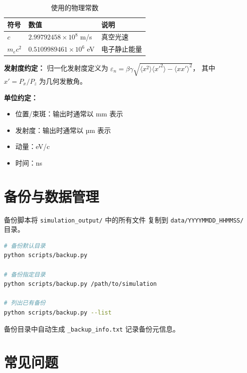 \documentclass[11pt,a4paper]{article}
\begin{document}
\begin{table}[h]
\centering
\caption{使用的物理常数}
\begin{tabular}{@{}lll@{}}
\toprule
\textbf{符号} & \textbf{数值} & \textbf{说明} \\
\midrule
$c$    & $2.99792458 \times 10^8$ m/s & 真空光速 \\
$m_e c^2$ & $0.5109989461 \times 10^6$ eV & 电子静止能量 \\
\bottomrule
\end{tabular}
\end{table}

\textbf{发射度约定：}
归一化发射度定义为
$\varepsilon_{n} = \beta\gamma \sqrt{\langle x^2\rangle\langle x'^2\rangle -
\langle xx'\rangle^2}$，
其中 $x' = P_x / P_z$ 为几何发散角。

\textbf{单位约定：}
\begin{itemize}
    \item 位置/束斑：输出时通常以 mm 表示
    \item 发射度：输出时通常以 µm 表示
    \item 动量：eV/c
    \item 时间：ns
\end{itemize}

\section{备份与数据管理}

备份脚本将 \texttt{simulation\_output/} 中的所有文件
复制到 \texttt{data/YYYYMMDD\_HHMMSS/} 目录。

\begin{lstlisting}[language=bash]
# 备份默认目录
python scripts/backup.py

# 备份指定目录
python scripts/backup.py /path/to/simulation

# 列出已有备份
python scripts/backup.py --list
\end{lstlisting}

备份目录中自动生成 \texttt{\_backup\_info.txt} 记录备份元信息。

\section{常见问题}
\end{document}
